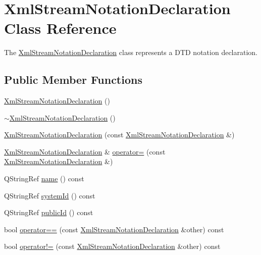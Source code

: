 \hypertarget{class_xml_stream_notation_declaration}{}\section{Xml\+Stream\+Notation\+Declaration Class Reference}
\label{class_xml_stream_notation_declaration}


The \hyperlink{class_xml_stream_notation_declaration}{Xml\+Stream\+Notation\+Declaration} class represents a D\+TD notation declaration.  


\subsection*{Public Member Functions}
\begin{DoxyCompactItemize}
\item 
\hyperlink{class_xml_stream_notation_declaration_ab189bffc2f535e607045e724645cea66}{Xml\+Stream\+Notation\+Declaration} ()
\item 
\hyperlink{class_xml_stream_notation_declaration_a39154003f4dde259994ad84dae38a428}{$\sim$\+Xml\+Stream\+Notation\+Declaration} ()
\item 
\hyperlink{class_xml_stream_notation_declaration_a6477e182d03d9981672ac72b9a52d8bd}{Xml\+Stream\+Notation\+Declaration} (const \hyperlink{class_xml_stream_notation_declaration}{Xml\+Stream\+Notation\+Declaration} \&)
\item 
\hyperlink{class_xml_stream_notation_declaration}{Xml\+Stream\+Notation\+Declaration} \& \hyperlink{class_xml_stream_notation_declaration_a3689e3063f5c7f21416d4c2b55913bbb}{operator=} (const \hyperlink{class_xml_stream_notation_declaration}{Xml\+Stream\+Notation\+Declaration} \&)
\item 
Q\+String\+Ref \hyperlink{class_xml_stream_notation_declaration_a4da496e98a28ca1a7900cb1b53e02ab7}{name} () const
\item 
Q\+String\+Ref \hyperlink{class_xml_stream_notation_declaration_a2d7315861053ed1130b180afaf2e67c6}{system\+Id} () const
\item 
Q\+String\+Ref \hyperlink{class_xml_stream_notation_declaration_a4469e6a2ccc3556cbaf787448d441e0b}{public\+Id} () const
\item 
bool \hyperlink{class_xml_stream_notation_declaration_acd0f30e890e5a8d9d2f0889f5d80d65e}{operator==} (const \hyperlink{class_xml_stream_notation_declaration}{Xml\+Stream\+Notation\+Declaration} \&other) const
\item 
bool \hyperlink{class_xml_stream_notation_declaration_a01ba1938f916a1bc849ad16e356aabfc}{operator!=} (const \hyperlink{class_xml_stream_notation_declaration}{Xml\+Stream\+Notation\+Declaration} \&other) const
\end{DoxyCompactItemize}
